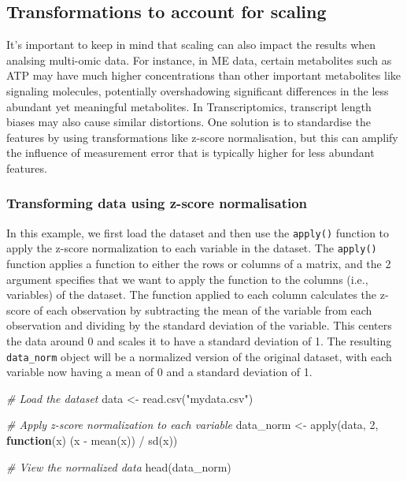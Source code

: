 \documentclass[
]{book}
\newenvironment{Shaded}{\begin{snugshade}}{\end{snugshade}}
\newcommand{\CommentTok}[1]{\textcolor[rgb]{0.56,0.35,0.01}{\textit{#1}}}
\newcommand{\ControlFlowTok}[1]{\textcolor[rgb]{0.13,0.29,0.53}{\textbf{#1}}}
\newcommand{\DecValTok}[1]{\textcolor[rgb]{0.00,0.00,0.81}{#1}}
\newcommand{\FunctionTok}[1]{\textcolor[rgb]{0.00,0.00,0.00}{#1}}
\newcommand{\NormalTok}[1]{#1}
\newcommand{\OtherTok}[1]{\textcolor[rgb]{0.56,0.35,0.01}{#1}}
\newcommand{\SpecialCharTok}[1]{\textcolor[rgb]{0.00,0.00,0.00}{#1}}
\newcommand{\StringTok}[1]{\textcolor[rgb]{0.31,0.60,0.02}{#1}}
\begin{document}
\hypertarget{data-transformation-scaling}{%
\subsection{Transformations to account for scaling}\label{data-transformation-scaling}}

It's important to keep in mind that scaling can also impact the results when analsing multi-omic data. For instance, in ME data, certain metabolites such as ATP may have much higher concentrations than other important metabolites like signaling molecules, potentially overshadowing significant differences in the less abundant yet meaningful metabolites. In Transcriptomics, transcript length biases may also cause similar distortions. One solution is to standardise the features by using transformations like z-score normalisation, but this can amplify the influence of measurement error that is typically higher for less abundant features.

\hypertarget{transforming-data-using-z-score-normalisation}{%
\subsubsection*{Transforming data using z-score normalisation}\label{transforming-data-using-z-score-normalisation}}

In this example, we first load the dataset and then use the \texttt{apply()} function to apply the z-score normalization to each variable in the dataset. The \texttt{apply()} function applies a function to either the rows or columns of a matrix, and the 2 argument specifies that we want to apply the function to the columns (i.e., variables) of the dataset. The function applied to each column calculates the z-score of each observation by subtracting the mean of the variable from each observation and dividing by the standard deviation of the variable. This centers the data around 0 and scales it to have a standard deviation of 1. The resulting \texttt{data\_norm} object will be a normalized version of the original dataset, with each variable now having a mean of 0 and a standard deviation of 1.

\begin{Shaded}
\begin{Highlighting}[]
\CommentTok{\# Load the dataset}
\NormalTok{data }\OtherTok{\textless{}{-}} \FunctionTok{read.csv}\NormalTok{(}\StringTok{"mydata.csv"}\NormalTok{)}

\CommentTok{\# Apply z{-}score normalization to each variable}
\NormalTok{data\_norm }\OtherTok{\textless{}{-}} \FunctionTok{apply}\NormalTok{(data, }\DecValTok{2}\NormalTok{, }\ControlFlowTok{function}\NormalTok{(x) (x }\SpecialCharTok{{-}} \FunctionTok{mean}\NormalTok{(x)) }\SpecialCharTok{/} \FunctionTok{sd}\NormalTok{(x))}

\CommentTok{\# View the normalized data}
\FunctionTok{head}\NormalTok{(data\_norm)}
\end{Highlighting}
\end{Shaded}
\end{document}
